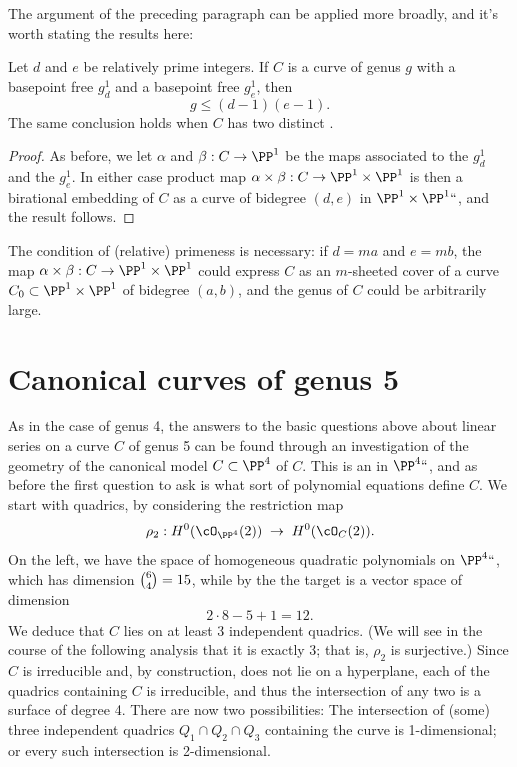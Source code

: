 The argument of the preceding paragraph can be applied more broadly,
and it's worth stating the results here:

\begin{proposition}\label{general gonality exclusion}
Let $d$ and $e$ be relatively prime integers. If $C$ is a curve of genus $g$ with a basepoint free $g^1_d$ and a basepoint free $g^1_e$, then
$$
g \leq (d-1)(e-1).
$$
The same conclusion holds when $C$ has two distinct
.
\end{proposition}

\begin{proof}
As before, we let $\alpha$ and $\beta : C \to \PP^1$ be the maps
associated to the $g^1_d$ and the $g^1_e$. In either case
product map $\alpha \times \beta : C \to \PP^1 \times \PP^1$ is then a
birational embedding of $C$ as a curve of bidegree $(d,e)$ in $\PP^1
\times \PP^1` `$, and the result follows.
\end{proof}

The condition of (relative) primeness is necessary: if $d=ma$ and
$e=mb$, the map $\alpha \times \beta : C \to \PP^1 \times \PP^1$ could
express $C$ as an $m$-sheeted cover of a curve $C_0 \subset \PP^1
\times \PP^1$ of bidegree $(a,b)$, and the genus of $C$ could be
arbitrarily large.

\section{Canonical curves of genus 5}

As in the  case of genus 4, the answers to the basic questions above
about linear series on a curve $C$ of genus 5 can be found through an
investigation of the geometry of the canonical model $C \subset \PP^4$
of $C$. This is an
%
in $\PP^4` `$, and as before the first
question to ask is what sort of polynomial equations define $C$. We
start with quadrics, by considering the restriction map
%
$$
\rho_2 : H^0(\cO_{\PP^4}(2)) \; \to \; H^0(\cO_{C}(2)).
$$
On the left, we have the space of homogeneous quadratic polynomials on
$\PP^4` `$, which has dimension $\tbinom{6}{4} = 15$, while by the
%
the target is a vector space of dimension
$$
2\cdot8 - 5 + 1 = 12.
$$
We deduce that $C$ lies on at least 3 independent quadrics. (We will
see in the course of the following analysis that it is exactly 3; that
is, $\rho_2$ is surjective.) Since $C$ is irreducible and, by
construction, does not lie on a hyperplane, each of the quadrics
containing $C$ is irreducible, and thus the intersection of any two is
a surface of degree 4. There are now two possibilities:  The
intersection of (some) three independent  quadrics $Q_1 \cap Q_2 \cap
Q_3$ containing the curve is 1-dimensional; or every such intersection
is 2-dimensional.


